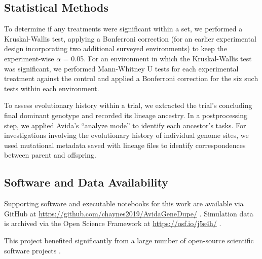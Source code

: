 \subsection{Statistical Methods}

To determine if any treatments were significant within a set, we performed a Kruskal-Wallis test, applying a Bonferroni correction (for an earlier experimental design incorporating two additional surveyed environments) to keep the experiment-wise $\alpha$ = 0.05.
For an environment in which the Kruskal-Wallis test was significant, we performed Mann-Whitney U tests for each experimental treatment against the control and applied a Bonferroni correction for the six such tests within each environment.

To assess evolutionary history within a trial, we extracted the trial's concluding final dominant genotype and recorded its lineage ancestry.
In a postprocessing step, we applied Avida's ``analyze mode'' to identify each ancestor's tasks.
For investigations involving the evolutionary history of individual genome sites, we used mutational metadata saved with lineage files to identify correspondences between parent and offspring.

\subsection{Software and Data Availability} \label{sec:materials}

Supporting software and executable notebooks for this work are available via GitHub at \url{https://github.com/chaynes2019/AvidaGeneDupe/} \citep{david_m_bryson_2025_14911296}.
Simulation data is archived via the Open Science Framework at \url{https://osf.io/j5s4h/} \citep{foster2017open}.

This project benefited significantly from a large number of open-source scientific software projects \citep{2020SciPy-NMeth,harris2020array,reback2020pandas,mckinney-proc-scipy-2010,waskom2021seaborn,hunter2007matplotlib,moreno2023teeplot,r_core_team_r:_2015}.
